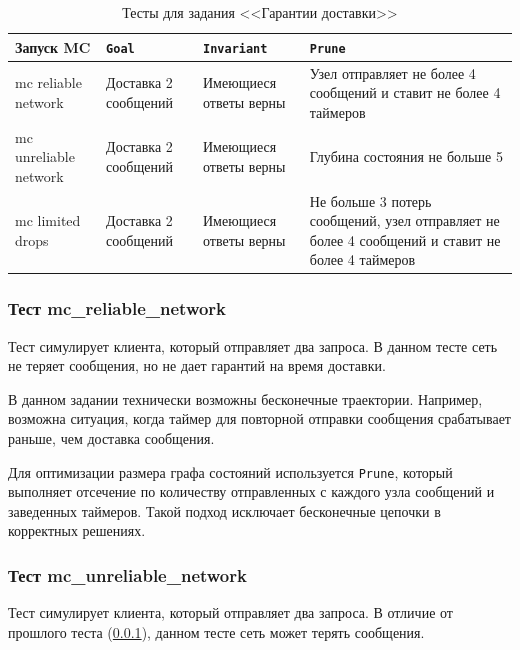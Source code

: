 \documentclass[a4paper,12pt]{extarticle}
\newcommand{\goal}[0]{\texttt{Goal}}
\newcommand{\prune}[0]{\texttt{Prune}}
\newcommand{\invariant}[0]{\texttt{Invariant}}
\newcommand{\mc}[0]{MC}
\begin{document}
\begin{table}[htbp]
    \caption{Тесты для задания <<Гарантии доставки>>}
    \begin{center}
    \begin{tabular}{|p{}|p{}|p{}|p{}|}
    \hline
    Запуск \mc & \goal & \invariant & \prune \\
    \hline
    mc reliable network & Доставка 2 сообщений & Имеющиеся ответы верны & Узел отправляет не более 4 сообщений и ставит не более 4 таймеров  \\
    \hline
    mc unreliable network  &  Доставка 2 сообщений & Имеющиеся ответы верны & Глубина состояния не больше 5  \\
    \hline
    mc limited drops  & Доставка 2 сообщений & Имеющиеся ответы верны & Не больше 3 потерь сообщений, узел отправляет не более 4 сообщений и ставит не более 4 таймеров \\
    \hline
    \end{tabular}
    \label{testsguarantees}
    \end{center}
\end{table}

\subsubsection{Тест mc\_reliable\_network}
\label{guarantees_test_1}

Тест симулирует клиента, который отправляет два запроса.
В данном тесте сеть не теряет сообщения, но не дает гарантий на время доставки.

В данном задании технически возможны бесконечные траектории.
Например, возможна ситуация, когда таймер для повторной отправки сообщения срабатывает раньше, чем доставка сообщения.


Для оптимизации размера графа состояний используется \prune, который выполняет отсечение по количеству отправленных с каждого узла сообщений и заведенных таймеров.
Такой подход исключает бесконечные цепочки в корректных решениях. 

\subsubsection{Тест mc\_unreliable\_network}
\label{guarantees_test_2}

Тест симулирует клиента, который отправляет два запроса.
В отличие от прошлого теста (\cref{guarantees_test_1}), данном тесте сеть может терять сообщения.
\end{document}
